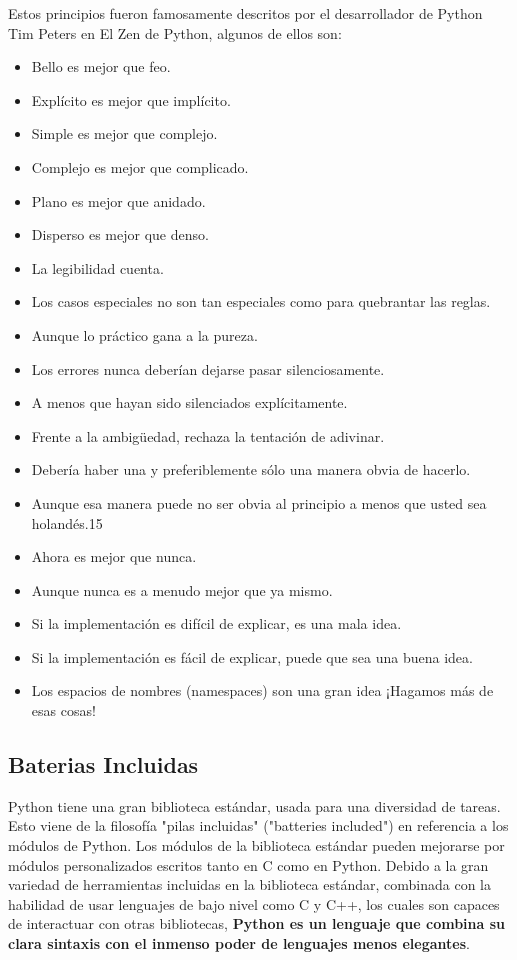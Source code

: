 Estos principios fueron famosamente descritos por el desarrollador de Python Tim
Peters en El Zen de Python, algunos de ellos son:

\begin{itemize}
    \item Bello es mejor que feo.
    \item Explícito es mejor que implícito.
    \item Simple es mejor que complejo.
    \item Complejo es mejor que complicado.
    \item Plano es mejor que anidado.
    \item Disperso es mejor que denso.
    \item La legibilidad cuenta.
    \item Los casos especiales no son tan especiales como para quebrantar las reglas.
    \item Aunque lo práctico gana a la pureza.
    \item Los errores nunca deberían dejarse pasar silenciosamente.
    \item A menos que hayan sido silenciados explícitamente.
    \item Frente a la ambigüedad, rechaza la tentación de adivinar.
    \item Debería haber una y preferiblemente sólo una manera obvia de hacerlo.
    \item Aunque esa manera puede no ser obvia al principio a menos que usted sea holandés.15
    \item Ahora es mejor que nunca.
    \item Aunque nunca es a menudo mejor que ya mismo.
    \item Si la implementación es difícil de explicar, es una mala idea.
    \item Si la implementación es fácil de explicar, puede que sea una buena idea.
    \item Los espacios de nombres (namespaces) son una gran idea ¡Hagamos más de esas cosas!
\end{itemize}


\subsection{Baterias Incluidas}

Python tiene una gran biblioteca estándar, usada para una diversidad de tareas.
Esto viene de la filosofía "pilas incluidas" ("batteries included") en referencia
a los módulos de Python. Los módulos de la biblioteca estándar pueden mejorarse por
módulos personalizados escritos tanto en C como en Python. Debido a la gran
variedad de herramientas incluidas en la biblioteca estándar, combinada con la
habilidad de usar lenguajes de bajo nivel como C y C++, los cuales son capaces
de interactuar con otras bibliotecas, {\bfseries Python es un lenguaje que combina su clara
sintaxis con el inmenso poder de lenguajes menos elegantes}.

